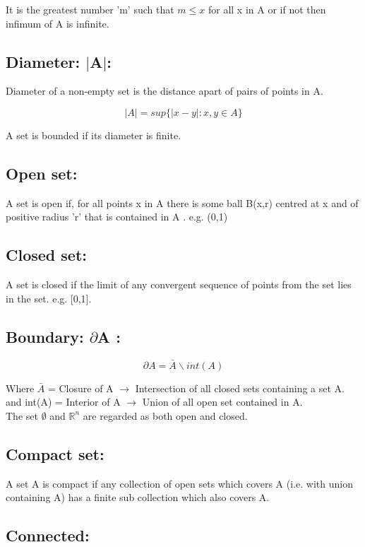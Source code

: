 \documentclass[14pt]{extarticle}
\begin{document}
\begin{enumerate}
It is the greatest number 'm' such that $m\leq x$ for all x in A or if not then infimum of A is infinite.

\subsection{Diameter: $|$A$|$:}

Diameter of a non-empty set is the distance apart of pairs of points in A.

$$|A|= sup\{|x-y|: x,y \in A\}$$

A set is bounded if its diameter is finite.

\subsection{Open set:}

A set is open if, for all points x in A there is some ball B(x,r) centred at x and of positive radius 'r' that is contained in A . e.g. (0,1)

\subsection{Closed set:}

A set is closed if the limit of any convergent sequence of points from the set lies in the set. e.g. [0,1].

\subsection{Boundary: $\partial$A :}
$$\partial A = \bar{A} \backslash int(A)$$

Where $\bar{A}$ = Closure of A $\rightarrow$ Intersection of all closed sets containing a set A.\\
and int(A) = Interior of A $\rightarrow$ Union of all open set contained in A.\\
The set $\emptyset$ and $\mathbb{R}^n$ are regarded as both open and closed.

\subsection{Compact set:}
A set A is compact if any collection of open sets which covers A (i.e. with union containing A) has a finite sub collection which also covers A.

\subsection{Connected:}


\end{enumerate}
\end{document}
